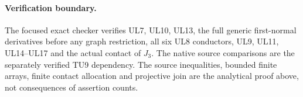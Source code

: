 \paragraph{Verification boundary.}
The focused exact checker verifies UL7, UL10, UL13, the full
generic first-normal derivatives before any graph restriction,
all six UL8 conductors, UL9, UL11, UL14--UL17 and the actual
contact of $J_3$. The native source comparisons are the separately
verified TU9 dependency. The source inequalities, bounded finite
arrays, finite contact allocation and projective join are the
analytical proof above, not consequences of assertion counts.
